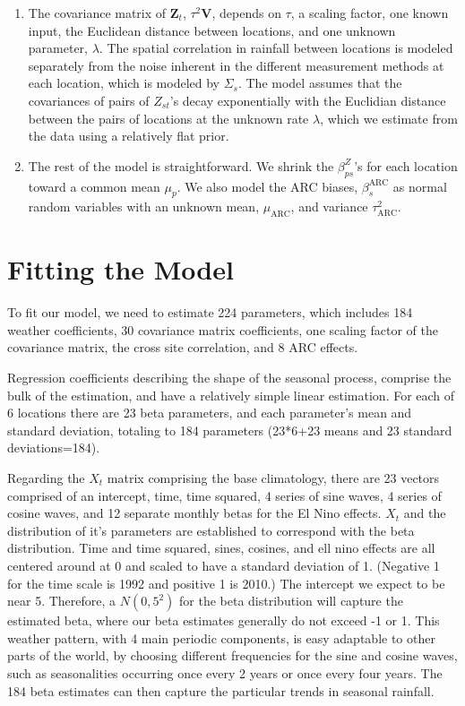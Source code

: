 \documentclass[12pt]{article}
\def\bZ{\pmb{Z}}
\def\bV{\pmb{V}}
\begin{document}
\begin{enumerate}
\item The covariance matrix of $\bZ_t$, $\tau^2\bV$, depends on $\tau$, a scaling factor, one known input, the Euclidean distance between locations, and one unknown parameter, $\lambda$. The spatial correlation in rainfall between locations is modeled separately from the noise inherent in the different measurement methods at each location, which is modeled by $\Sigma_s$. The model assumes that the covariances of pairs of $Z_{st}$'s decay exponentially with the Euclidian distance between the pairs of locations at the unknown rate $\lambda$, which we estimate from the data using a relatively flat prior.
\item The rest of the model is straightforward. We shrink the $\beta_{ps}^Z$'s for each location toward a common mean $\mu_p$. We also model the ARC biases, $\beta^\text{ARC}_s$ as normal random variables with an unknown mean, $\mu_\text{ARC}$, and variance $\tau_\text{ARC}^2$.
\end{enumerate}

\section{Fitting the Model}
\label{sec:fit}

To fit our model, we need to estimate 224 parameters, which includes 184 weather coefficients, 30 covariance matrix coefficients, one scaling factor of the covariance matrix, the cross site correlation, and 8 ARC effects. 

Regression coefficients describing the shape of the seasonal process, comprise the bulk of the estimation, and have a relatively simple linear estimation. For each of 6 locations there are 23 beta parameters, and each parameter's mean and standard deviation, totaling to 184 parameters (23*6+23 means and 23 standard deviations=184). 

Regarding the $X_t$ matrix comprising the base climatology, there are 23 vectors comprised of an intercept, time, time squared, 4 series of sine waves, 4 series of cosine waves, and 12 separate monthly betas for the El Nino effects. $X_t$ and the distribution of it's parameters are established to correspond with the beta distribution. Time and time squared, sines, cosines, and ell nino effects are all centered around at 0 and scaled to have a standard deviation of 1. (Negative 1 for the time scale is 1992 and positive 1 is 2010.) The  intercept we expect to be near 5. Therefore, a $N(0,5^2)$ for the beta distribution will capture the estimated beta, where our beta estimates generally do not exceed -1 or 1. This weather pattern, with 4 main periodic components, is easy adaptable to other parts of the world, by choosing different frequencies for the sine and cosine waves, such as seasonalities occurring once every 2 years or once every four years. The 184 beta estimates can then capture the particular trends in seasonal rainfall. 
\end{document}
